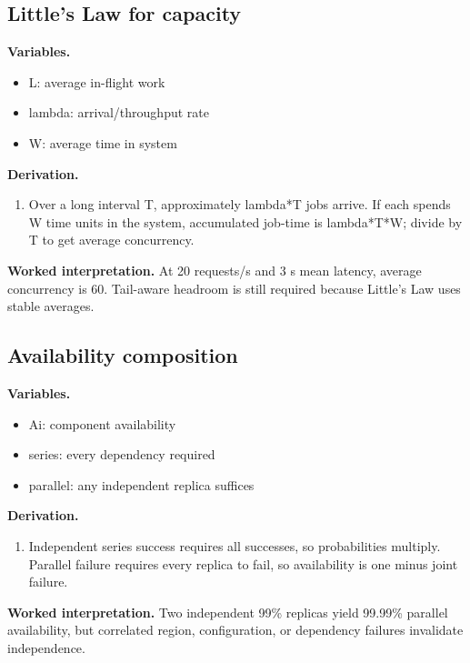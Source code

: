 \subsection{Little's Law for capacity}
\textbf{Variables.}\begin{itemize}
\item L: average in-flight work
\item lambda: arrival/throughput rate
\item W: average time in system
\end{itemize}
\textbf{Derivation.}\begin{derivation}\begin{enumerate}
\item Over a long interval T, approximately lambda*T jobs arrive. If each spends W time units in the system, accumulated job-time is lambda*T*W; divide by T to get average concurrency.
\end{enumerate}\end{derivation}
\textbf{Worked interpretation.} At 20 requests/s and 3 s mean latency, average concurrency is 60. Tail-aware headroom is still required because Little's Law uses stable averages.
\subsection{Availability composition}
\textbf{Variables.}\begin{itemize}
\item Ai: component availability
\item series: every dependency required
\item parallel: any independent replica suffices
\end{itemize}
\textbf{Derivation.}\begin{derivation}\begin{enumerate}
\item Independent series success requires all successes, so probabilities multiply. Parallel failure requires every replica to fail, so availability is one minus joint failure.
\end{enumerate}\end{derivation}
\textbf{Worked interpretation.} Two independent 99\% replicas yield 99.99\% parallel availability, but correlated region, configuration, or dependency failures invalidate independence.
